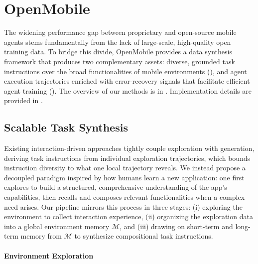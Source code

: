\documentclass{article} %
\begin{document}
\section{OpenMobile}
The widening performance gap between proprietary and open-source mobile agents stems fundamentally from the lack of large-scale, high-quality open training data.
To bridge this divide, OpenMobile provides a data synthesis framework that produces two complementary assets: diverse, grounded task instructions over the broad functionalities of mobile environments (), and agent execution trajectories enriched with error-recovery signals that facilitate efficient agent training ().
The overview of our methods is in .
Implementation details are provided in .

\subsection{Scalable Task Synthesis}
\label{sec:task_synthesis}

Existing interaction-driven approaches tightly couple exploration with generation, deriving task instructions from individual exploration trajectories, which bounds instruction diversity to what one local trajectory reveals.
We instead propose a decoupled paradigm inspired by how humans learn a new application: one first explores to build a structured, comprehensive understanding of the app's capabilities, then recalls and composes relevant functionalities when a complex need arises.
Our pipeline mirrors this process in three stages: (i) exploring the environment to collect interaction experience, (ii) organizing the exploration data into a global environment memory $\mathcal{M}$, and (iii) drawing on short-term and long-term memory from $\mathcal{M}$ to synthesize compositional task instructions.

\paragraph{Environment Exploration}
\end{document}
